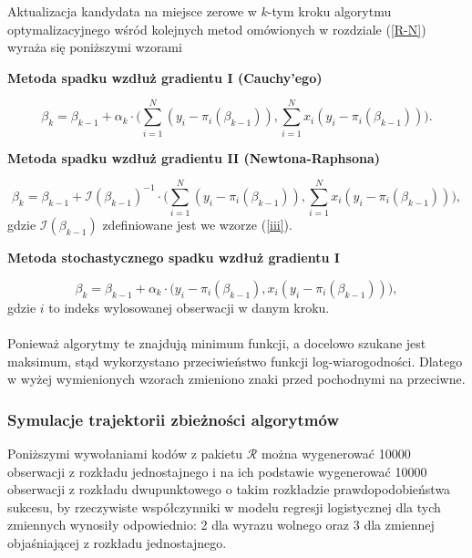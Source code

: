 Aktualizacja kandydata na miejsce zerowe w $k$-tym kroku algorytmu optymalizacyjnego wśród kolejnych metod omówionych w rozdziale (\ref{R-N}) wyraża się poniższymi wzorami
\\
\begin{center}
\textbf{Metoda spadku wzdłuż gradientu I (Cauchy’ego)}
\end{center}
\begin{equation*}
\beta_{k} = \beta_{k-1} + \alpha_{k}\cdot\Big(\sum\limits_{i=1}^{N}(y_i-\pi_i(\beta_{k-1})), \sum\limits_{i=1}^{N}x_i(y_i-\pi_i(\beta_{k-1}))\Big).
\end{equation*}
\begin{center}
\textbf{Metoda spadku wzdłuż gradientu II (Newtona-Raphsona)}
\end{center}
\begin{equation*}
\beta_{k} = \beta_{k-1} + \mathscr{I}(\beta_{k-1})^{-1}\cdot\Big(\sum\limits_{i=1}^{N}(y_i-\pi_i(\beta_{k-1})), \sum\limits_{i=1}^{N}x_i(y_i-\pi_i(\beta_{k-1}))\Big),
\end{equation*}
gdzie $\mathscr{I}(\beta_{k-1})$ zdefiniowane jest we wzorze (\ref{iii}). 
\begin{center}
\textbf{Metoda stochastycznego spadku wzdłuż gradientu I}
\end{center}
\begin{equation*}
\beta_{k} = \beta_{k-1} + \alpha_{k}\cdot\Big(y_i-\pi_i(\beta_{k-1}), x_i(y_i-\pi_i(\beta_{k-1}))\Big),
\end{equation*}
gdzie $i$ to indeks wylosowanej obserwacji w danym kroku.
\\ \ \\
Ponieważ algorytmy te znajdują minimum funkcji, a docelowo szukane jest maksimum, stąd wykorzystano przeciwieństwo funkcji log-wiarogodności. Dlatego w wyżej wymienionych wzorach zmieniono znaki przed pochodnymi na przeciwne.

\newpage
\subsubsection{Symulacje trajektorii zbieżności algorytmów}
Poniższymi wywołaniami kodów z pakietu $\mathcal{R}$ można wygenerować 10000 obserwacji z rozkładu jednostajnego i na ich podstawie wygenerować 10000 obserwacji z rozkładu dwupunktowego o takim rozkładzie prawdopodobieństwa sukcesu, by rzeczywiste współczynniki w modelu regresji logistycznej dla tych zmiennych wynosiły odpowiednio: 2 dla wyrazu wolnego oraz 3 dla zmiennej objaśniającej z rozkładu jednostajnego. 
\begin{Shaded}
\begin{Highlighting}[]
\StringTok{ }\NormalTok{(}\NormalTok{)}
\StringTok{ } \NormalTok{+}\StringTok{ }
\StringTok{ }\NormalTok{/(}\NormalTok{+}
\StringTok{ }\NormalTok{(}\NormalTok{,}
\end{Highlighting}
\end{Shaded}

